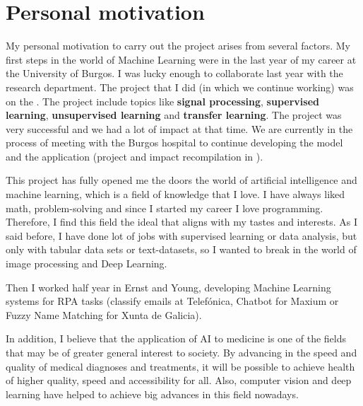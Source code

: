 \section{Personal motivation}

My personal motivation to carry out the project arises from several factors. My first steps in the world of Machine Learning were in the last year of my career at the University of Burgos. I was lucky enough to collaborate last year with the  research department. The project that I did (in which we continue working) was on the . The project include topics like \textbf{signal processing}, \textbf{supervised learning}, \textbf{unsupervised learning} and \textbf{transfer learning}. The project was very successful and we had a lot of impact at that time. We are currently in the process of meeting with the Burgos hospital to continue developing the model and the application (project and impact recompilation in ).

This project has fully opened me the doors the world of artificial intelligence and machine learning, which is a field of knowledge that I love. I have always liked math, problem-solving and since I started my career I love programming. Therefore, I find this field the ideal that aligns with my tastes and interests. As I said before, I have done lot of jobs with supervised learning or data analysis, but only with tabular data sets or text-datasets, so I wanted to break in the world of image processing and Deep Learning.

Then I worked half year in Ernst and Young, developing Machine Learning systems for RPA tasks (classify emails at Telefónica, Chatbot for Maxium or Fuzzy Name Matching for Xunta de Galicia).

In addition, I believe that the application of AI to medicine is one of the fields that may be of greater general interest to society. By advancing in the speed and quality of medical diagnoses and treatments, it will be possible to achieve health of higher quality, speed and accessibility for all. Also, computer vision and deep learning have helped to achieve big advances in this field nowadays. 
